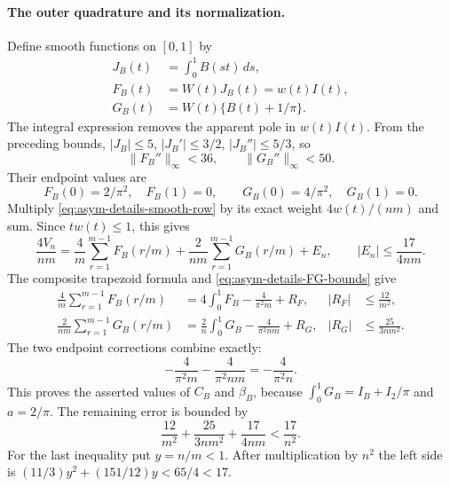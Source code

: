 \paragraph{The outer quadrature and its normalization.}
Define smooth functions on $[0,1]$ by
\[
 \begin{aligned}
 J_B(t)&=\int_0^1B(st)\,ds,\\
 F_B(t)&=W(t)J_B(t)=w(t)I(t),\\
 G_B(t)&=W(t)\{B(t)+1/\pi\}.
 \end{aligned}
\]
The integral expression removes the apparent pole in $w(t)I(t)$.
From the preceding bounds,
$|J_B|\leq5$, $|J_B'|\leq3/2$, $|J_B''|\leq5/3$, so
\begin{equation}\label{eq:asym-details-FG-bounds}
 \|F_B''\|_\infty<36,\qquad\|G_B''\|_\infty<50.
\end{equation}
Their endpoint values are
\[
 F_B(0)=2/\pi^2,\quad F_B(1)=0,\qquad
 G_B(0)=4/\pi^2,\quad G_B(1)=0.
\]
Multiply \eqref{eq:asym-details-smooth-row} by its exact weight
$4w(t)/(nm)$ and sum.  Since $tw(t)\leq1$, this gives
\begin{equation}\label{eq:asym-details-smooth-outer}
 \frac{4V_n}{nm}=\frac4m\sum_{r=1}^{m-1}F_B(r/m)
          +\frac2{nm}\sum_{r=1}^{m-1}G_B(r/m)+E_n,
 \qquad |E_n|\leq\frac{17}{4nm}.
\end{equation}
The composite trapezoid formula and
\eqref{eq:asym-details-FG-bounds} give
\begin{align*}
 \frac4m\sum_{r=1}^{m-1}F_B(r/m)
   &=4\int_0^1F_B-\frac4{\pi^2m}+R_F,
       &|R_F|&\leq\frac{12}{m^2},\\
 \frac2{nm}\sum_{r=1}^{m-1}G_B(r/m)
   &=\frac2n\int_0^1G_B-\frac4{\pi^2nm}+R_G,
       &|R_G|&\leq\frac{25}{3nm^2}.
\end{align*}
The two endpoint corrections combine exactly:
\[
 -\frac4{\pi^2m}-\frac4{\pi^2nm}=-\frac4{\pi^2n}.
\]
This proves the asserted values of $C_B$ and $\beta_B$, because
$\int_0^1G_B=I_B+I_2/\pi$ and $a=2/\pi$.
The remaining error is bounded by
\[
 \frac{12}{m^2}+\frac{25}{3nm^2}+\frac{17}{4nm}<\frac{17}{n^2}.
\]
For the last inequality put $y=n/m<1$.  After multiplication by
$n^2$ the left side is
$(11/3)y^2+(151/12)y<65/4<17$.

